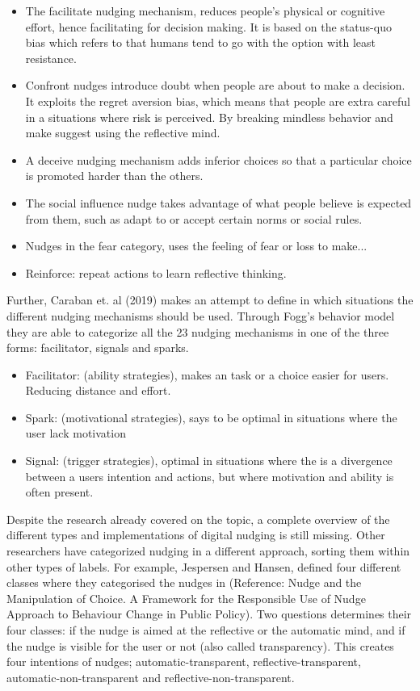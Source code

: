 \begin{itemize}
\item The facilitate nudging mechanism, reduces people's physical or cognitive effort, hence facilitating for decision making. It is based on the status-quo bias which refers to that humans tend to go with the option with least resistance.
\item Confront nudges introduce doubt when people are about to make a decision. It exploits the regret aversion bias, which means that people are extra careful in a situations where risk is perceived. By breaking mindless behavior and make suggest using the reflective mind. 
\item A deceive nudging mechanism adds inferior choices so that a particular choice is promoted harder than the others. 
\item The social influence nudge takes advantage of what people believe is expected from them, such as adapt to or accept certain norms or social rules. 
\item Nudges in the fear category, uses the feeling of fear or loss to make... 
\item Reinforce: repeat actions to learn reflective thinking. 
\end{itemize}

Further, Caraban et. al (2019) makes an attempt to define in which situations the different nudging mechanisms should be used. Through Fogg's behavior model they are able to categorize all the 23 nudging mechanisms in one of the three forms: facilitator, signals and sparks.

\begin{itemize}
\item Facilitator: (ability strategies), makes an task or a choice easier for users. Reducing distance and effort. 
\item Spark: (motivational strategies), says to be optimal in situations where the user lack motivation 
\item Signal: (trigger strategies), optimal in situations where the is a divergence between a users intention and actions, but where motivation and ability is often present. 
\end{itemize}

Despite the research already covered on the topic, a complete overview of the different types and implementations of digital nudging is still missing. Other researchers have categorized nudging in a different approach, sorting them within other types of labels. For example, Jespersen and Hansen, defined four different classes where they categorised the nudges in (Reference: Nudge and the Manipulation of Choice. A Framework for the Responsible Use of Nudge Approach to Behaviour Change in Public Policy). Two questions determines their four classes: if the nudge is aimed at the reflective or the automatic mind, and if the nudge is visible for the user or not (also called transparency). This creates four intentions of nudges; automatic-transparent, reflective-transparent, automatic-non-transparent and reflective-non-transparent.  

